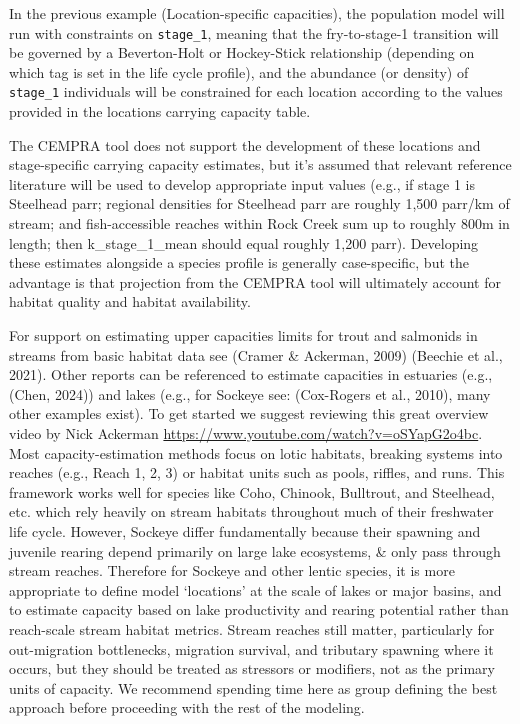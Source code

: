 \documentclass[
  letterpaper,
  DIV=11,
  numbers=noendperiod]{scrreprt}
\begin{document}
In the previous example (Location-specific capacities), the population
model will run with constraints on \texttt{stage\_1}, meaning that the
fry-to-stage-1 transition will be governed by a Beverton-Holt or
Hockey-Stick relationship (depending on which tag is set in the life
cycle profile), and the abundance (or density) of \texttt{stage\_1}
individuals will be constrained for each location according to the
values provided in the locations carrying capacity table.

The CEMPRA tool does not support the development of these locations and
stage-specific carrying capacity estimates, but it's assumed that
relevant reference literature will be used to develop appropriate input
values (e.g., if stage 1 is Steelhead parr; regional densities for
Steelhead parr are roughly 1,500 parr/km of stream; and fish-accessible
reaches within Rock Creek sum up to roughly 800m in length; then
k\_stage\_1\_mean should equal roughly 1,200 parr). Developing these
estimates alongside a species profile is generally case-specific, but
the advantage is that projection from the CEMPRA tool will ultimately
account for habitat quality and habitat availability.

For support on estimating upper capacities limits for trout and
salmonids in streams from basic habitat data see (Cramer \& Ackerman,
2009) (Beechie et al., 2021). Other reports can be referenced to
estimate capacities in estuaries (e.g., (Chen, 2024)) and lakes (e.g.,
for Sockeye see: (Cox-Rogers et al., 2010), many other examples exist).
To get started we suggest reviewing this great overview video by Nick
Ackerman \url{https://www.youtube.com/watch?v=oSYapG2o4bc}. Most
capacity-estimation methods focus on lotic habitats, breaking systems
into reaches (e.g., Reach 1, 2, 3) or habitat units such as pools,
riffles, and runs. This framework works well for species like Coho,
Chinook, Bulltrout, and Steelhead, etc. which rely heavily on stream
habitats throughout much of their freshwater life cycle. However,
Sockeye differ fundamentally because their spawning and juvenile rearing
depend primarily on large lake ecosystems, \& only pass through stream
reaches. Therefore for Sockeye and other lentic species, it is more
appropriate to define model `locations' at the scale of lakes or major
basins, and to estimate capacity based on lake productivity and rearing
potential rather than reach-scale stream habitat metrics. Stream reaches
still matter, particularly for out-migration bottlenecks, migration
survival, and tributary spawning where it occurs, but they should be
treated as stressors or modifiers, not as the primary units of capacity.
We recommend spending time here as group defining the best approach
before proceeding with the rest of the modeling.
\end{document}
